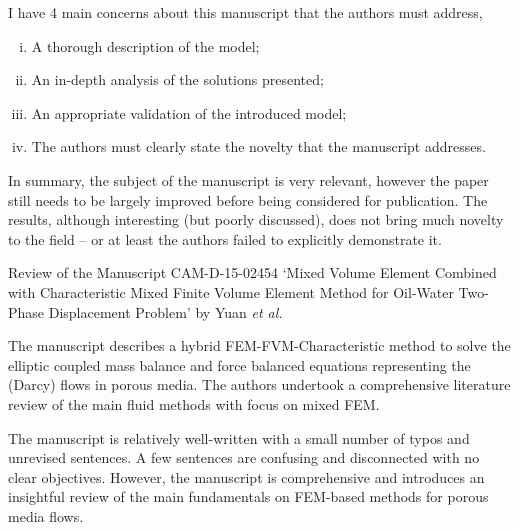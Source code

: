 \documentclass[14pt,twoside]{report}
\begin{document}
I have 4 main concerns about this manuscript that the authors must address,
\begin{enumerate}[(i)]
\item A thorough description of the model;
\item An in-depth analysis of the solutions presented;
\item An appropriate validation of the introduced model;
\item The authors must clearly state the novelty that the manuscript addresses.
\end{enumerate}

In summary, the subject of the manuscript is very relevant, however the paper still needs to be largely improved before being considered for publication. The results, although interesting (but poorly discussed), does not bring much novelty to the field -- or at least the authors failed to explicitly demonstrate it. 


{
  }



\clearpage



\begin{center}
  {\Large Review of the Manuscript CAM-D-15-02454 `Mixed Volume Element Combined with Characteristic Mixed Finite Volume Element Method for Oil-Water Two-Phase Displacement Problem' by Yuan {\it et al.}}
\end{center}

\medskip

The manuscript describes a hybrid FEM-FVM-Characteristic method to solve the elliptic coupled mass balance and force balanced equations representing the (Darcy) flows in porous media. The authors undertook a comprehensive literature review of the main fluid methods with focus on mixed FEM.

The manuscript is relatively well-written with a small number of typos and unrevised sentences. A few sentences are confusing and disconnected with no clear objectives. However, the manuscript is comprehensive and introduces an insightful review of the main fundamentals on FEM-based methods for porous media flows. 
\end{document}
